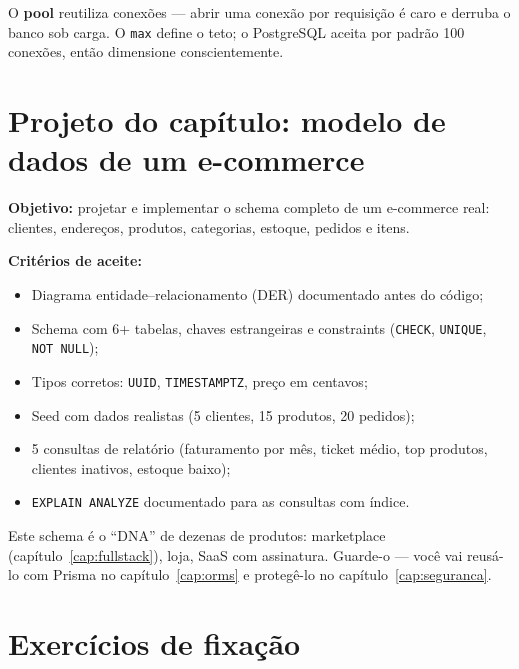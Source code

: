 \begin{caixadica}
O \textbf{pool} reutiliza conexões — abrir uma conexão por requisição é
caro e derruba o banco sob carga. O \texttt{max} define o teto; o PostgreSQL
aceita por padrão 100 conexões, então dimensione conscientemente.
\end{caixadica}

\section{Projeto do capítulo: modelo de dados de um e-commerce}
\label{sec:projeto12}

\begin{caixaprojeto}
\textbf{Objetivo:} projetar e implementar o schema completo de um e-commerce
real: clientes, endereços, produtos, categorias, estoque, pedidos e itens.

\textbf{Critérios de aceite:}
\begin{itemize}[leftmargin=*, itemsep=0.2em]
  \item Diagrama entidade--relacionamento (DER) documentado antes do código;
  \item Schema com 6+ tabelas, chaves estrangeiras e constraints (\texttt{CHECK}, \texttt{UNIQUE}, \texttt{NOT NULL});
  \item Tipos corretos: \texttt{UUID}, \texttt{TIMESTAMPTZ}, preço em centavos;
  \item Seed com dados realistas (5 clientes, 15 produtos, 20 pedidos);
  \item 5 consultas de relatório (faturamento por mês, ticket médio, top produtos, clientes inativos, estoque baixo);
  \item \texttt{EXPLAIN ANALYZE} documentado para as consultas com índice.
\end{itemize}
\end{caixaprojeto}

\begin{caixadica}
Este schema é o ``DNA'' de dezenas de produtos: marketplace (capítulo~\ref{cap:fullstack}),
loja, SaaS com assinatura. Guarde-o — você vai reusá-lo com Prisma no
capítulo~\ref{cap:orms} e protegê-lo no capítulo~\ref{cap:seguranca}.
\end{caixadica}

\section{Exercícios de fixação}

